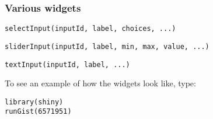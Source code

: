 \documentclass{beamer}
\begin{document}
	\begin{frame}[fragile]
		\frametitle{Various widgets}

		\begin{exampleblock}{}
		\begin{BVerbatim}
selectInput(inputId, label, choices, ...)
		\end{BVerbatim}
		\end{exampleblock}{}

		\vspace{1em}

		\begin{exampleblock}{}
		\begin{BVerbatim}
sliderInput(inputId, label, min, max, value, ...)
		\end{BVerbatim}
		\end{exampleblock}{}

		\vspace{1em}

		\begin{exampleblock}{}
		\begin{BVerbatim}
textInput(inputId, label, ...)
		\end{BVerbatim}
		\end{exampleblock}{}

		\vspace{1em}

		To see an example of how the widgets look like, type:

		\vspace{1em}

		\begin{exampleblock}{}
		\begin{BVerbatim}
library(shiny)
runGist(6571951)
		\end{BVerbatim}
		\end{exampleblock}{}

	\end{frame}
\end{document}
